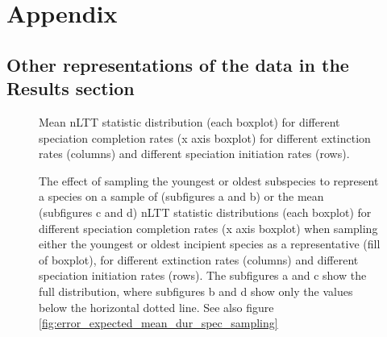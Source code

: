 \section{Appendix}

\subsection{Other representations of the data in the Results section}

\begin{figure}
  \caption{
    Mean nLTT statistic distribution (each boxplot) 
    for different speciation completion rates (x axis boxplot)
    for different extinction rates (columns)
    and different speciation initiation rates (rows). 
  }
  \label{fig:error_for_scr}
\end{figure}

\begin{figure}[!htbp]
  \subfloat[]{
  }
  \subfloat[]{
  }

  \subfloat[]{
  }
  \subfloat[]{
  }

  \caption{
    The effect of sampling the youngest or oldest subspecies to represent a species
    on a sample of (subfigures a and b) or the mean (subfigures c and d) 
    nLTT statistic distributions (each boxplot) 
    for different speciation completion rates (x axis boxplot)
    when sampling either the youngest or oldest incipient species as a representative (fill of boxplot),
    for different extinction rates (columns)
    and different speciation initiation rates (rows). 
    The subfigures a and c show the full distribution, where subfigures
    b and d show only the values below the horizontal dotted line.
    See also figure \ref{fig:error_expected_mean_dur_spec_sampling}
  }
  \label{fig:error_sampling_representative}
\end{figure}

